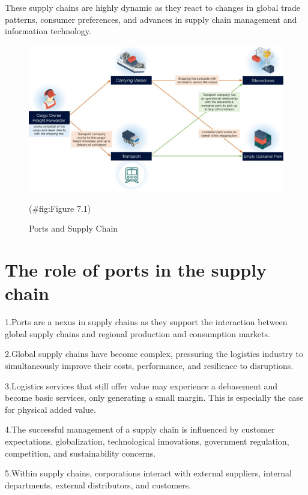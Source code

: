 \documentclass[
]{book}
\begin{document}
These supply chains are highly dynamic as they react to changes in global trade patterns, consumer preferences, and advances in supply chain management and information technology.

\begin{figure}

{\centering \includegraphics{./Images/supplychain/Ports and Supply Chain} 

}

\caption{Ports and Supply Chain}(\#fig:Figure 7.1)
\end{figure}

\hypertarget{SupplyChain-Seaportrole}{%
\section{The role of ports in the supply chain}\label{SupplyChain-Seaportrole}}

1.Ports are a nexus in supply chains as they support the interaction between global supply chains and regional production and consumption markets.

2.Global supply chains have become complex, pressuring the logistics industry to simultaneously improve their costs, performance, and resilience to disruptions.

3.Logistics services that still offer value may experience a debasement and become basic services, only generating a small margin. This is especially the case for physical added value.

4.The successful management of a supply chain is influenced by customer expectations, globalization, technological innovations, government regulation, competition, and sustainability concerns.

5.Within supply chains, corporations interact with external suppliers, internal departments, external distributors, and customers.
\end{document}
